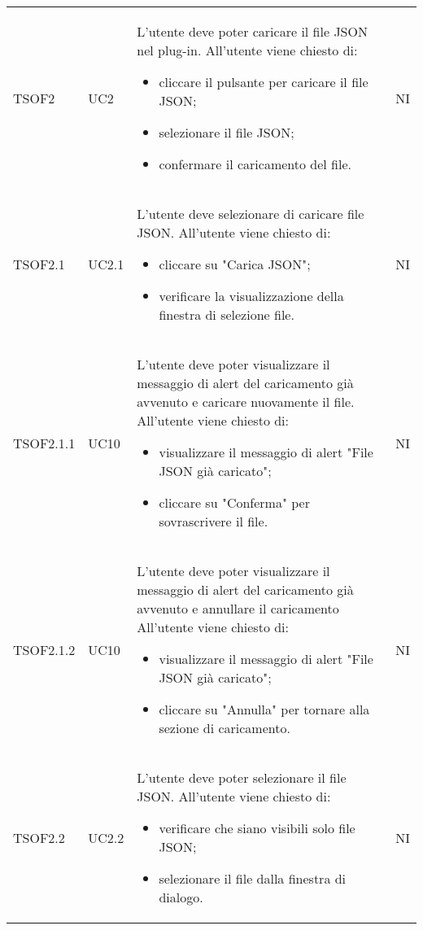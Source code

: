 \begin{longtable}{C{2.5cm} C{2.5cm} L{8cm} C{2cm}}
TSOF2 & UC2 &
L'utente deve poter caricare il file JSON nel plug-in. \newline All'utente viene chiesto di:
\begin{itemize}
	\item cliccare il pulsante per caricare il file JSON;
	\item selezionare il file JSON;
	\item confermare il caricamento del file.
\end{itemize} & NI	\\


TSOF2.1 & UC2.1 &
L'utente deve selezionare di caricare file JSON. \newline All'utente viene chiesto di:
\begin{itemize}
	\item cliccare su "Carica JSON";
	\item verificare la visualizzazione della finestra di selezione file.
\end{itemize} & NI	\\

TSOF2.1.1 & UC10 &
L'utente deve poter visualizzare il messaggio di alert del caricamento già avvenuto e caricare nuovamente il file. \newline All'utente viene chiesto di:
\begin{itemize}
	\item visualizzare il messaggio di alert "File JSON già caricato";
	\item cliccare su "Conferma" per sovrascrivere il file.
\end{itemize} & NI	\\

TSOF2.1.2 & UC10 &
L'utente deve poter visualizzare il messaggio di alert del caricamento già avvenuto e annullare il caricamento \newline All'utente viene chiesto di:
\begin{itemize}
	\item visualizzare il messaggio di alert "File JSON già caricato";
	\item cliccare su "Annulla" per tornare alla sezione di caricamento.
\end{itemize} & NI	\\

TSOF2.2 & UC2.2 &
L'utente deve poter selezionare il file JSON. \newline All'utente viene chiesto di:
\begin{itemize}
	\item verificare che siano visibili solo file JSON;
	\item selezionare il file dalla finestra di dialogo.
\end{itemize} & NI	\\


\end{longtable}
